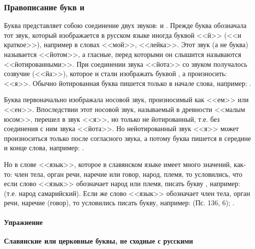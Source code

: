 \documentclass[11pt,a4paper,oneside]{memoir}
\begin{document}
                \subsubsection{Правописание букв {\large{}} и {\large{}}}

    Буква {} представляет собою соединение двух звуков: {} и {}. Прежде буква {} обозначала тот звук, который изображается в русском языке иногда буквой <<й>> (<<и краткое>>), например в словах <<мой>>, <<лейка>>. Этот звук (а не буква) называется <<йотом>>, а гласные, перед которыми он слышится называются <<йотированными>>. При соединении звука <<йота>> со звуком {} получалось созвучие {} (<<йа>>), которое и стали изображать буквой {}, а произносить: <<я>>. Обычно йотированная буква {} пишется только в начале слова, например: {}.
    
    Буква {} первоначально изображала носовой звук, произносимый как <<ем>> или <<ен>>. Впоследствии этот носовой звук, называемый в древности <<малым юсом>>, перешел в звук <<я>>, но только не йотированный, т.е. без соединения с ним звука <<йота>>. Но нейотированный звук <<я>> может произноситься только после согласного звука, а потому буква {} пишется в середине и конце слова, например: {}.
    
    Но в слове <<язык>>, которое в славянском языке имеет много значений, как-то: член тела, орган речи, наречие или говор, народ, племя, то условились, что если слово <<язык>> обозначает народ или племя, писать букву {}, например: {} (т.е. народ самарийский). Если же слово <<язык>> обозначает член тела, орган речи, наречие (говор), то условились писать букву{}, например: {} (Пс. 136, 6); {}.
    
                    \paragraph{Упражнение}

    \textbf{Славянские или церковные буквы, не сходные с русскими}
    \medskip
    
\end{document}
